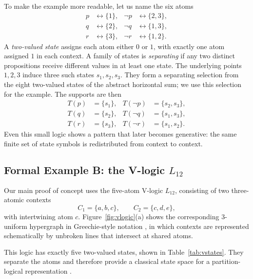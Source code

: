 \documentclass[
  10pt,
  twocolumn,
  aps,
  pra,
  showkeys,
  amsmath,amssymb,
  longbibliography
]{revtex4-2}
\begin{document}
To make the example more readable, let us name the six atoms
\begin{align}
p &\leftrightarrow \{1\}, & \neg p &\leftrightarrow \{2,3\},
\nonumber\\
q &\leftrightarrow \{2\}, & \neg q &\leftrightarrow \{1,3\},
\nonumber\\
r &\leftrightarrow \{3\}, & \neg r &\leftrightarrow \{1,2\}.
\end{align}
A \emph{two-valued state} assigns each atom either \(0\) or \(1\), with exactly one atom assigned \(1\) in each context. A family of states is \emph{separating} if any two distinct propositions receive different values in at least one state. The underlying points \(1,2,3\) induce three such states \(s_1,s_2,s_3\). They form a separating selection from the eight two-valued states of the abstract horizontal sum; we use this selection for the example. The supports are then
\begin{align}
T(p)&=\{s_1\}, & T(\neg p)&=\{s_2,s_3\},
\nonumber\\
T(q)&=\{s_2\}, & T(\neg q)&=\{s_1,s_3\},
\nonumber\\
T(r)&=\{s_3\}, & T(\neg r)&=\{s_1,s_2\}.
\label{eq:hsupports}
\end{align}
Even this small logic shows a pattern that later becomes generative: the same finite set of state symbols is redistributed from context to context.

\subsection{Formal Example B: the V-logic \texorpdfstring{\(L_{12}\)}{L12}}

Our main proof of concept uses the five-atom V-logic \(L_{12}\), consisting of two three-atomic contexts
\begin{equation}
C_1=\{a,b,c\},
\qquad
C_2=\{c,d,e\},
\end{equation}
with intertwining atom \(c\). Figure~\ref{fig:vlogic}(a) shows the corresponding 3-uniform hypergraph in Greechie-style notation \cite{greechie:71}, in which contexts are represented schematically by unbroken lines that intersect at shared atoms.

This logic has exactly five two-valued states, shown in Table~\ref{tab:vstates}. They separate the atoms and therefore provide a classical state space for a partition-logical representation \cite[Theorem~0]{kochen1}.
\end{document}
